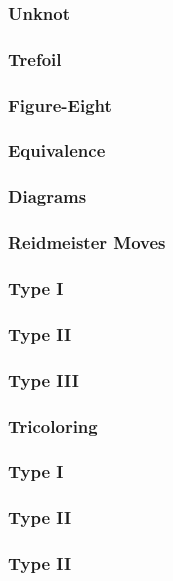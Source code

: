 \documentclass{beamer}
\begin{document}
\begin{frame}
  \frametitle{Unknot}
  
\end{frame}

\begin{frame}
  \frametitle{Trefoil}
  
\end{frame}

\begin{frame}
  \frametitle{Figure-Eight}
  
\end{frame}

\begin{frame}
  \frametitle{Equivalence}
  
\end{frame}

\begin{frame}
  \frametitle{Diagrams}
  
\end{frame}

\begin{frame}
  \frametitle{Reidmeister Moves}
  
\end{frame}

\begin{frame}
  \frametitle{Type I}
  
\end{frame}

\begin{frame}
  \frametitle{Type II}
  
\end{frame}

\begin{frame}
  \frametitle{Type III}
  
\end{frame}

\begin{frame}
  \frametitle{Tricoloring}
  
\end{frame}

\begin{frame}
  \frametitle{Type I}
  
\end{frame}

\begin{frame}
  \frametitle{Type II}
  
\end{frame}

\begin{frame}
  \frametitle{Type II}
  
\end{frame}
\end{document}
